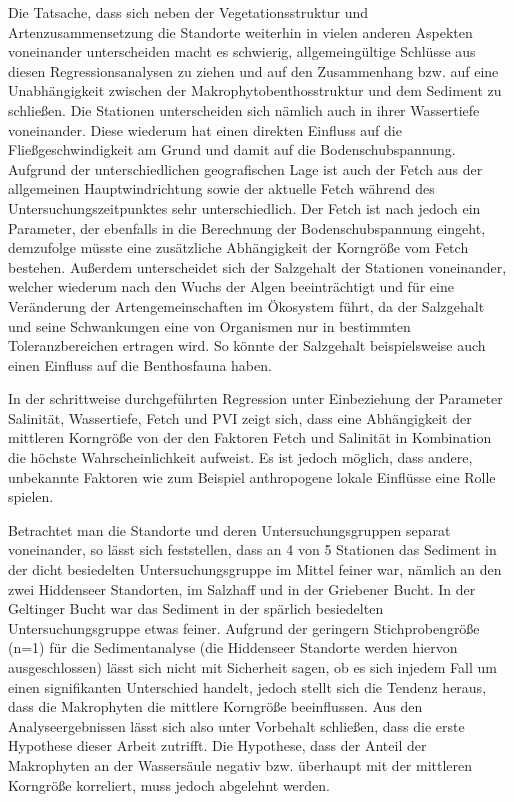 Die Tatsache, dass sich neben der Vegetationsstruktur und Artenzusammensetzung die Standorte weiterhin in vielen anderen Aspekten voneinander unterscheiden macht es schwierig, allgemeingültige Schlüsse aus diesen Regressionsanalysen zu ziehen und auf den Zusammenhang bzw. auf eine Unabhängigkeit zwischen der Makrophytobenthosstruktur und dem Sediment zu schließen. Die Stationen unterscheiden sich nämlich auch in ihrer Wassertiefe voneinander. Diese wiederum hat einen direkten Einfluss auf die Fließgeschwindigkeit am Grund und damit auf die Bodenschubspannung. Aufgrund der unterschiedlichen geografischen Lage ist auch der Fetch aus der allgemeinen Hauptwindrichtung sowie der aktuelle Fetch während des Untersuchungszeitpunktes sehr unterschiedlich. Der Fetch ist nach \cite{laenen_1996} jedoch ein Parameter, der ebenfalls in die Berechnung der Bodenschubspannung eingeht, demzufolge müsste eine zusätzliche Abhängigkeit der Korngröße vom Fetch bestehen. Außerdem unterscheidet sich der Salzgehalt der Stationen voneinander, welcher wiederum nach \cite{schwenke_1995}  den Wuchs der Algen beeinträchtigt und für eine Veränderung der Artengemeinschaften im Ökosystem führt, da der Salzgehalt und seine Schwankungen eine von Organismen nur in bestimmten Toleranzbereichen ertragen wird. So könnte der Salzgehalt beispielsweise auch einen Einfluss auf die Benthosfauna haben.

In der schrittweise durchgeführten Regression unter Einbeziehung der Parameter Salinität, Wassertiefe, Fetch und PVI zeigt sich, dass eine Abhängigkeit der mittleren Korngröße von der den Faktoren Fetch und Salinität in Kombination die höchste Wahrscheinlichkeit aufweist. Es ist jedoch möglich, dass andere, unbekannte Faktoren wie zum Beispiel anthropogene lokale Einflüsse eine Rolle spielen.

Betrachtet man die Standorte und deren Untersuchungsgruppen separat voneinander, so lässt sich feststellen, dass  an 4 von 5 Stationen das Sediment in der dicht besiedelten Untersuchungsgruppe im Mittel feiner war, nämlich an den zwei Hiddenseer Standorten, im Salzhaff und in der Griebener Bucht. In der Geltinger Bucht war das Sediment in der spärlich besiedelten Untersuchungsgruppe etwas feiner. Aufgrund der geringern Stichprobengröße (n=1) für die Sedimentanalyse (die Hiddenseer Standorte werden hiervon ausgeschlossen) lässt sich nicht mit Sicherheit sagen, ob es sich injedem Fall um einen signifikanten Unterschied handelt, jedoch stellt sich die Tendenz heraus, dass die Makrophyten die mittlere Korngröße beeinflussen. 
Aus den Analyseergebnissen lässt sich also unter Vorbehalt schließen, dass die erste Hypothese dieser Arbeit zutrifft. Die Hypothese, dass der Anteil der Makrophyten an der Wassersäule negativ bzw. überhaupt mit der mittleren Korngröße korreliert, muss jedoch abgelehnt werden.





